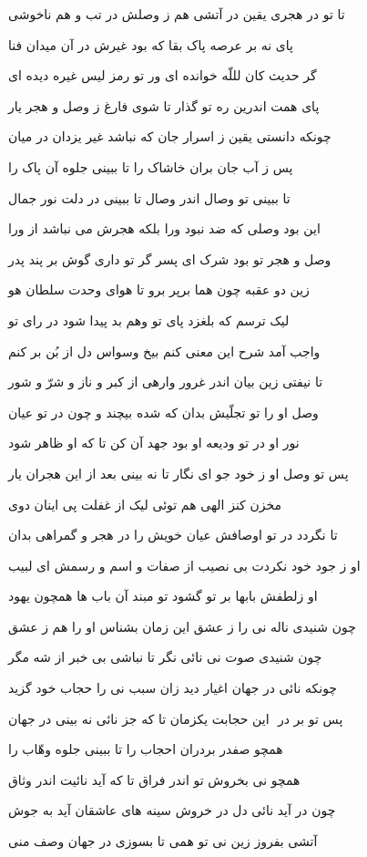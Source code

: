 تا تو در هجرى يقين در آتشى
هم ز وصلش در تب و هم ناخوشى

پاى نه بر عرصه پاک بقا
که بود غيرش در آن ميدان فنا

گر حديث کان لللّه خوانده اى
ور تو رمز ليس غيره ديده اى

پاى همت اندرين ره تو گذار
تا شوى فارغ ز وصل و هجر يار

چونکه دانستى يقين ز اسرار
جان که نباشد غير يزدان در ميان

پس ز آب جان بران خاشاک را
تا ببينى جلوه آن پاک را

تا ببينى تو وصال اندر وصال
تا ببينى در دلت نور جمال

اين بود وصلی که ضد نبود ورا
بلکه هجرش مى نباشد از ورا

وصل و هجر تو بود شرک اى پسر
گر تو دارى گوش بر پند پدر

زين دو عقبه چون هما برپر برو
تا هواى وحدت سلطان هو

ليک ترسم که بلغزد پاى تو
وهم بد پيدا شود در راى تو

واجب آمد شرح اين معنى کنم
بيخ وسواس دل از بُن بر کنم

تا نيفتى زين بيان اندر غرور
وارهى از کبر و ناز و شرّ و شور

وصل او را تو تجلّيش بدان
که شده بيچند و چون در تو عيان

نور او در تو وديعه او بود
جهد آن کن تا که او ظاهر شود

پس تو وصل او ز خود جو اى نگار
تا نه بينى بعد از اين هجران يار

مخزن کنز الهى هم توئى
ليک از غفلت پى اينان دوى

تا نگردد در تو اوصافش عيان
خويش را در هجر و گمراهى بدان

او ز جود خود نکردت بى نصيب
از صفات و اسم و رسمش اى لبيب

او زلطفش بابها بر تو گشود
تو مبند آن باب ها همچون يهود

چون شنيدى‌ ناله نى را ز عشق
اين زمان بشناس او را هم ز عشق

چون شنيدى صوت نى نائى نگر
تا نباشى بى خبر از شه مگر

چونکه نائى در جهان اغيار ديد
زان سبب نى را حجاب خود گزيد

پس تو بر در ‌ اين حجابت يکزمان
تا که جز نائى نه بينى در جهان

همچو صفدر بردران احجاب را
تا ببينى جلوه وهّاب را

همچو نى بخروش تو اندر فراق
تا که آيد نائيت اندر وثاق

چون در آيد نائى دل در خروش
سينه هاى عاشقان آيد به جوش

آتشى بفروز زين نى تو همى
تا بسوزى در جهان وصف منى

